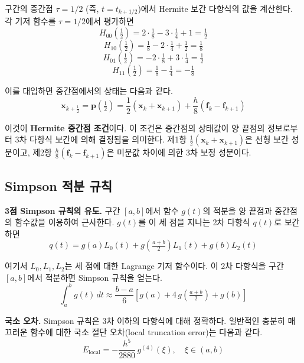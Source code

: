 \documentclass[11pt]{article}
\begin{document}
구간의 중간점 $\tau = 1/2$ (즉, $t = t_{k+1/2}$)에서 Hermite 보간 다항식의 값을 계산한다. 각 기저 함수를 $\tau = 1/2$에서 평가하면
\[
H_{00}\!\left(\tfrac{1}{2}\right) = 2 \cdot \tfrac{1}{8} - 3 \cdot \tfrac{1}{4} + 1 = \tfrac{1}{2}
\]
\[
H_{10}\!\left(\tfrac{1}{2}\right) = \tfrac{1}{8} - 2 \cdot \tfrac{1}{4} + \tfrac{1}{2} = \tfrac{1}{8}
\]
\[
H_{01}\!\left(\tfrac{1}{2}\right) = -2 \cdot \tfrac{1}{8} + 3 \cdot \tfrac{1}{4} = \tfrac{1}{2}
\]
\[
H_{11}\!\left(\tfrac{1}{2}\right) = \tfrac{1}{8} - \tfrac{1}{4} = -\tfrac{1}{8}
\]

이를 대입하면 중간점에서의 상태는 다음과 같다.
\begin{equation}
\label{eq:hermite-midpoint}
\mathbf{x}_{k+\frac{1}{2}} = \mathbf{p}\!\left(\tfrac{1}{2}\right) = \frac{1}{2}(\mathbf{x}_k + \mathbf{x}_{k+1}) + \frac{h}{8}(\mathbf{f}_k - \mathbf{f}_{k+1})
\end{equation}

이것이 \textbf{Hermite 중간점 조건}이다. 이 조건은 중간점의 상태값이 양 끝점의 정보로부터 3차 다항식 보간에 의해 결정됨을 의미한다. 제1항 $\frac{1}{2}(\mathbf{x}_k + \mathbf{x}_{k+1})$은 선형 보간 성분이고, 제2항 $\frac{h}{8}(\mathbf{f}_k - \mathbf{f}_{k+1})$은 미분값 차이에 의한 3차 보정 성분이다.


\subsection{Simpson 적분 규칙}
\label{sec:simpson}

\textbf{3점 Simpson 규칙의 유도.} 구간 $[a, b]$에서 함수 $g(t)$의 적분을 양 끝점과 중간점의 함수값을 이용하여 근사한다. $g(t)$를 이 세 점을 지나는 2차 다항식 $q(t)$로 보간하면
\[
q(t) = g(a) L_0(t) + g\!\left(\tfrac{a+b}{2}\right) L_1(t) + g(b) L_2(t)
\]

여기서 $L_0, L_1, L_2$는 세 점에 대한 Lagrange 기저 함수이다. 이 2차 다항식을 구간 $[a, b]$에서 적분하면 Simpson 규칙을 얻는다.
\begin{equation}
\label{eq:simpson-rule}
\int_a^b g(t)\, dt \approx \frac{b - a}{6} \left[ g(a) + 4\, g\!\left(\tfrac{a+b}{2}\right) + g(b) \right]
\end{equation}

\textbf{국소 오차.} Simpson 규칙은 3차 이하의 다항식에 대해 정확하다. 일반적인 충분히 매끄러운 함수에 대한 국소 절단 오차(local truncation error)는 다음과 같다.
\[
E_{\text{local}} = -\frac{h^5}{2880}\, g^{(4)}(\xi), \quad \xi \in (a, b)
\]
\end{document}
